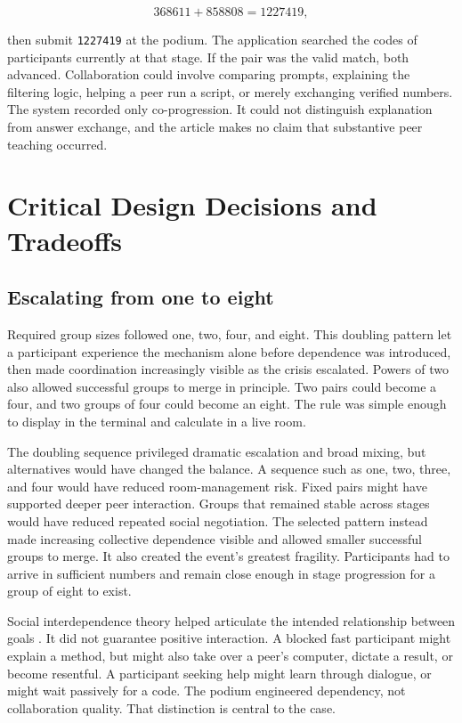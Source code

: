 \documentclass[11pt,a4paper]{article}
\begin{document}
\[
368611 + 858808 = 1227419,
\]

then submit \texttt{1227419} at the podium. The application searched the codes of participants currently at that stage. If the pair was the valid match, both advanced. Collaboration could involve comparing prompts, explaining the filtering logic, helping a peer run a script, or merely exchanging verified numbers. The system recorded only co-progression. It could not distinguish explanation from answer exchange, and the article makes no claim that substantive peer teaching occurred.

\section{Critical Design Decisions and Tradeoffs}

\subsection{Escalating from one to eight}

Required group sizes followed one, two, four, and eight. This doubling pattern let a participant experience the mechanism alone before dependence was introduced, then made coordination increasingly visible as the crisis escalated. Powers of two also allowed successful groups to merge in principle. Two pairs could become a four, and two groups of four could become an eight. The rule was simple enough to display in the terminal and calculate in a live room.

The doubling sequence privileged dramatic escalation and broad mixing, but alternatives would have changed the balance. A sequence such as one, two, three, and four would have reduced room-management risk. Fixed pairs might have supported deeper peer interaction. Groups that remained stable across stages would have reduced repeated social negotiation. The selected pattern instead made increasing collective dependence visible and allowed smaller successful groups to merge. It also created the event's greatest fragility. Participants had to arrive in sufficient numbers and remain close enough in stage progression for a group of eight to exist.

Social interdependence theory helped articulate the intended relationship between goals \citep{johnson2009interdependence}. It did not guarantee positive interaction. A blocked fast participant might explain a method, but might also take over a peer's computer, dictate a result, or become resentful. A participant seeking help might learn through dialogue, or might wait passively for a code. The podium engineered dependency, not collaboration quality. That distinction is central to the case.
\end{document}
